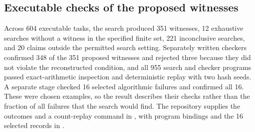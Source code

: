 \subsection{Executable checks of the proposed witnesses}
\label{sec:results}




\label{sec:results-twins}

Across 604 executable tasks, the search produced 351 witnesses, 12 exhaustive searches without a witness in the specified finite set, 221 inconclusive searches, and 20 claims outside the permitted search setting. Separately written checkers confirmed 348 of the 351 proposed witnesses and rejected three because they did not violate the reconstructed condition, and all 955 search and checker programs passed exact-arithmetic inspection and deterministic replay with two hash seeds. A separate stage checked 16 selected algorithmic failures and confirmed all 16. These were chosen examples, so the result describes their checks rather than the fraction of all failures that the search would find. The repository supplies the outcomes and a count-replay command in , with program bindings and the 16 selected records in .
